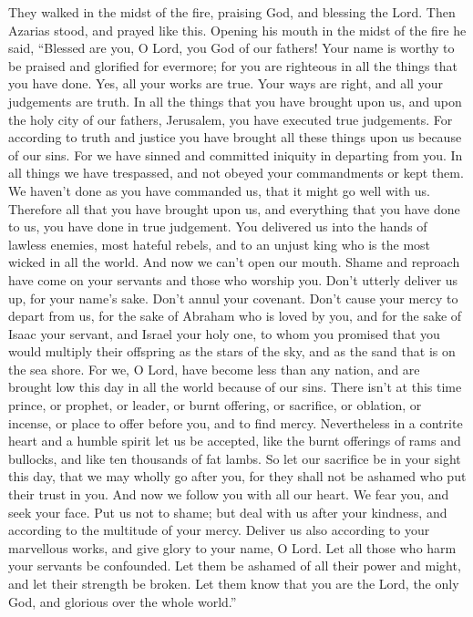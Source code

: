  They walked in the midst of the fire, praising God, and
blessing the Lord.  Then Azarias stood, and prayed like
this. Opening his mouth in the midst of the fire he said, 
``Blessed are you, O Lord, you God of our fathers! Your name is worthy
to be praised and glorified for evermore;  for you are
righteous in all the things that you have done. Yes, all your works are
true. Your ways are right, and all your judgements are truth.
 In all the things that you have brought upon us, and upon
the holy city of our fathers, Jerusalem, you have executed true
judgements. For according to truth and justice you have brought all
these things upon us because of our sins.  For we have
sinned and committed iniquity in departing from you.  In
all things we have trespassed, and not obeyed your commandments or kept
them. We haven't done as you have commanded us, that it might go well
with us.  Therefore all that you have brought upon us, and
everything that you have done to us, you have done in true judgement.
 You delivered us into the hands of lawless enemies, most
hateful rebels, and to an unjust king who is the most wicked in all the
world.  And now we can't open our mouth. Shame and reproach
have come on your servants and those who worship you. 
Don't utterly deliver us up, for your name's sake. Don't annul your
covenant.  Don't cause your mercy to depart from us, for
the sake of Abraham who is loved by you, and for the sake of Isaac your
servant, and Israel your holy one,  to whom you promised
that you would multiply their offspring as the stars of the sky, and as
the sand that is on the sea shore.  For we, O Lord, have
become less than any nation, and are brought low this day in all the
world because of our sins.  There isn't at this time
prince, or prophet, or leader, or burnt offering, or sacrifice, or
oblation, or incense, or place to offer before you, and to find mercy.
 Nevertheless in a contrite heart and a humble spirit let
us be accepted,  like the burnt offerings of rams and
bullocks, and like ten thousands of fat lambs. So let our sacrifice be
in your sight this day, that we may wholly go after you, for they shall
not be ashamed who put their trust in you.  And now we
follow you with all our heart. We fear you, and seek your face.
 Put us not to shame; but deal with us after your kindness,
and according to the multitude of your mercy.  Deliver us
also according to your marvellous works, and give glory to your name, O
Lord. Let all those who harm your servants be confounded. 
Let them be ashamed of all their power and might, and let their strength
be broken.  Let them know that you are the Lord, the only
God, and glorious over the whole world.''


